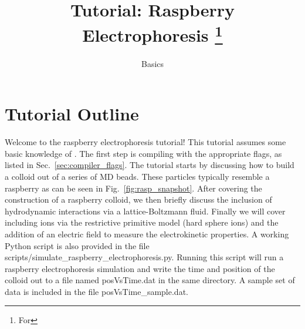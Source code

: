 \documentclass[
paper=a4,                       %
fontsize=11pt,                  %
twoside,                        %
footsepline,                    %
headsepline,                    %
headinclude=false,              %
footinclude=false,              %
pagesize,                       %
]{scrartcl}
\begin{document}
\esptitlehead
\title{Tutorial: Raspberry Electrophoresis%
\ifdefined\esversion%
\thanks{For \es \esversion}%
\fi%
}
\subtitle{\es Basics}
\maketitle


\section{Tutorial Outline}

Welcome to the raspberry electrophoresis \es{} tutorial! This tutorial assumes some basic knowledge of \es{}.
The first step is compiling \es{} with the appropriate flags, as listed in Sec.~\ref{sec:compiler_flags}.
The tutorial starts by discussing how to build a colloid out of a series of MD beads. These particles typically
resemble a raspberry as can be seen in Fig.~\ref{fig:rasp_snapshot}. After covering the construction of a raspberry colloid, we then
briefly discuss the inclusion of hydrodynamic interactions via a lattice-Boltzmann fluid. Finally we will cover
including ions via the restrictive primitive model (hard sphere ions) and the addition of an electric field
to measure the electrokinetic properties. A working Python script is also provided in the file scripts/simulate\_raspberry\_electrophoresis.py. Running
this script will run a raspberry electrophoresis simulation and write the time and position of the colloid out to a file named posVsTime.dat in the same directory.
A sample set of data is included in the file posVsTime\_sample.dat.
\end{document}
